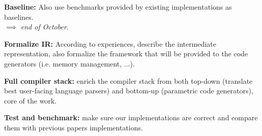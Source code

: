 \item \textbf{Baseline:} Also use benchmarks provided by existing implementations as baselines.\\
$\implies$ \emph{end of October}.

\item \textbf{Formalize IR:} According to experiences, describe the intermediate representation, also formalize the framework that will be provided to the code generators (i.e. memory management, ...).
\item \textbf{Full compiler stack:} enrich the compiler stack from both top-down (translate best user-facing language parsers) and bottom-up (parametric code generators), core of the work.
\item \textbf{Test and benchmark:} make sure our implementations are correct and compare them with previous papers implementations.
\ole








